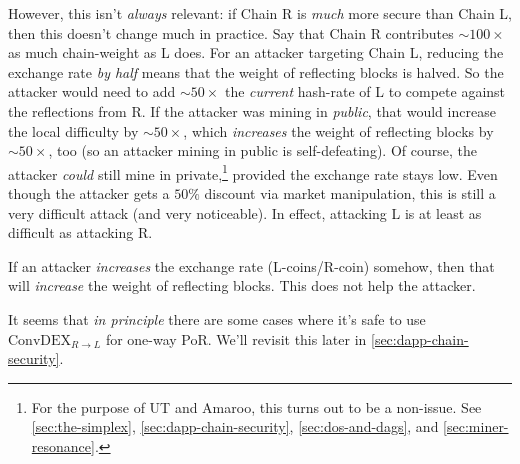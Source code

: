 However, this isn't \emph{always} relevant: if Chain R is \emph{much} more secure than Chain L, then this doesn't change much in practice.
Say that Chain R contributes $\sim 100\times$ as much chain-weight as L does.
For an attacker targeting Chain L, reducing the exchange rate \emph{by half} means that the weight of reflecting blocks is halved.
So the attacker would need to add $\sim 50\times$ the \emph{current} hash-rate of L to compete against the reflections from R.
If the attacker was mining in \emph{public}, that would increase the local difficulty by $\sim 50\times$, which \emph{increases} the weight of reflecting blocks by $\sim 50\times$, too (so an attacker mining in public is self-defeating).
Of course, the attacker \emph{could} still mine in private,\footnote{
    For the purpose of UT and Amaroo, this turns out to be a non-issue.
    See \autoref{sec:the-simplex}, \autoref{sec:dapp-chain-security}, \autoref{sec:dos-and-dags}, and \autoref{sec:miner-resonance}.
} provided the exchange rate stays low.
Even though the attacker gets a $50\%$ discount via market manipulation, this is still a very difficult attack (and very noticeable).
In effect, attacking L is at least as difficult as attacking R.

If an attacker \emph{increases} the exchange rate (L-coins/R-coin) somehow, then that will \emph{increase} the weight of reflecting blocks.
This does not help the attacker.

It seems that \emph{in principle} there are some cases where it's safe to use $\text{ConvDEX}_{R\rightarrow L}$ for one-way PoR.
We'll revisit this later in \autoref{sec:dapp-chain-security}.


